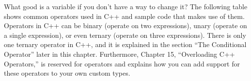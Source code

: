 
What good is a variable if you don’t have a way to change it? The following table shows common operators used in C++ and sample code that makes use of them. Operators in C++ can be binary (operate on two expressions), unary (operate on a single expression), or even ternary (operate on three expressions). There is only one ternary operator in C++, and it is explained in the section “The Conditional Operator” later in this chapter. Furthermore, Chapter 15, “Overloading C++ Operators,” is reserved for operators and explains how you can add support for these operators to your own custom types.

